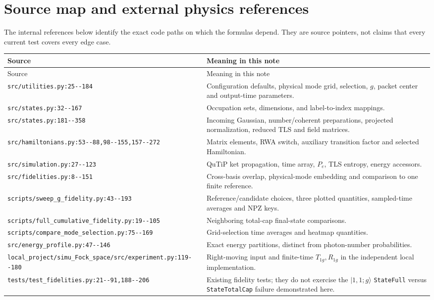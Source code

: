 \documentclass[11pt,a4paper]{article}
\newcommand{\ket}[1]{\lvert #1\rangle}
\newcommand{\code}[1]{\nolinkurl{#1}}
\begin{document}
\section{Source map and external physics references}
\label{sec:sources}
The internal references below identify the exact code paths on which the formulas depend. They are source pointers, not claims that every current test covers every edge case.
\begin{center}\small
\begin{longtable}{p{}p{}}
\toprule Source & Meaning in this note\\\midrule\endfirsthead
\toprule Source & Meaning in this note\\\midrule\endhead
\code{src/utilities.py:25--184} & Configuration defaults, physical mode grid, selection, $g$, packet center and output-time parameters.\\
\code{src/states.py:32--167} & Occupation sets, dimensions, and label-to-index mappings.\\
\code{src/states.py:181--358} & Incoming Gaussian, number/coherent preparations, projected normalization, reduced TLS and field matrices.\\
\code{src/hamiltonians.py:53--88,98--155,157--272} & Matrix elements, RWA switch, auxiliary transition factor and selected Hamiltonian.\\
\code{src/simulation.py:27--123} & QuTiP ket propagation, time array, $P_e$, TLS entropy, energy accessors.\\
\code{src/fidelities.py:8--151} & Cross-basis overlap, physical-mode embedding and comparison to one finite reference.\\
\code{scripts/sweep_g_fidelity.py:43--193} & Reference/candidate choices, three plotted quantities, sampled-time averages and NPZ keys.\\
\code{scripts/full_cumulative_fidelity.py:19--105} & Neighboring total-cap final-state comparisons.\\
\code{scripts/compare_mode_selection.py:75--169} & Grid-selection time averages and heatmap quantities.\\
\code{src/energy_profile.py:47--146} & Exact energy partitions, distinct from photon-number probabilities.\\
\code{local_project/simu_Fock_space/src/experiment.py:119--180} & Right-moving input and finite-time $T_{1g},R_{1g}$ in the independent local implementation.\\
\code{tests/test_fidelities.py:21--91,188--206} & Existing fidelity tests; they do not exercise the $\ket{1,1;g}$ \code{StateFull} versus \code{StateTotalCap} failure demonstrated here.\\
\bottomrule
\end{longtable}
\end{center}
\end{document}
